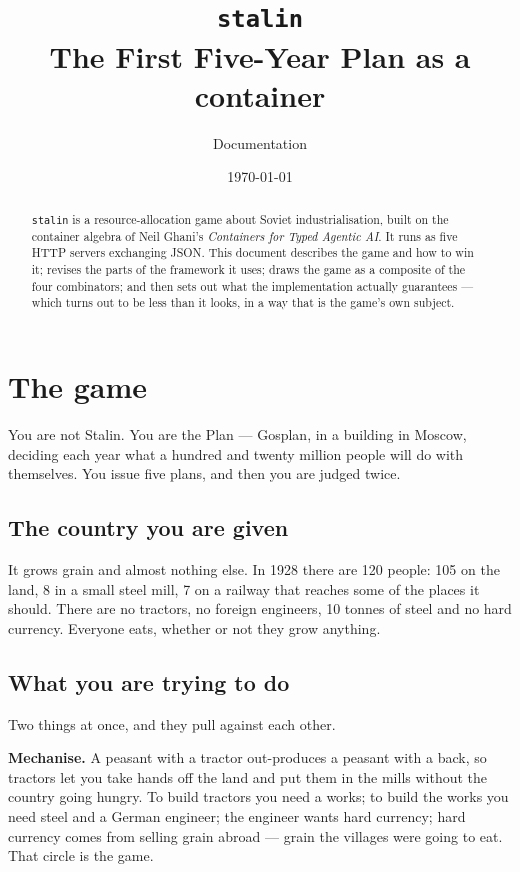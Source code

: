 \documentclass[11pt,a4paper]{article}
\title{\vspace{-2em}\textbf{\texttt{stalin}}\\[2mm]
  \large The First Five-Year Plan as a container}
\author{\normalsize Documentation}
\date{\normalsize\today}
\begin{document}
\maketitle
\thispagestyle{empty}

\begin{abstract}
\noindent
\texttt{stalin} is a resource-allocation game about Soviet industrialisation,
built on the container algebra of Neil Ghani's \emph{Containers for Typed
Agentic AI}. It runs as five HTTP servers exchanging JSON. This document
describes the game and how to win it; revises the parts of the framework it
uses; draws the game as a composite of the four combinators; and then sets out
what the implementation actually guarantees --- which turns out to be less than
it looks, in a way that is the game's own subject.
\end{abstract}

\tableofcontents
\newpage

\section{The game}

You are not Stalin. You are the Plan --- Gosplan, in a building in Moscow,
deciding each year what a hundred and twenty million people will do with
themselves. You issue five plans, and then you are judged twice.

\subsection{The country you are given}

It grows grain and almost nothing else. In 1928 there are 120 people: 105 on
the land, 8 in a small steel mill, 7 on a railway that reaches some of the
places it should. There are no tractors, no foreign engineers, 10 tonnes of
steel and no hard currency. Everyone eats, whether or not they grow anything.

\subsection{What you are trying to do}

Two things at once, and they pull against each other.

\textbf{Mechanise.} A peasant with a tractor out-produces a peasant with a
back, so tractors let you take hands off the land and put them in the mills
without the country going hungry. To build tractors you need a works; to build
the works you need steel and a German engineer; the engineer wants hard
currency; hard currency comes from selling grain abroad --- grain the villages
were going to eat. That circle is the game.
\end{document}
